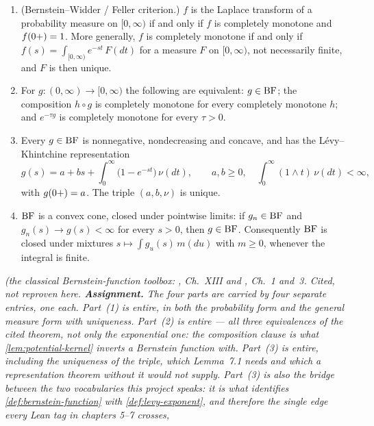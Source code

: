 \begin{proposition}\label{prop:bernstein-toolbox}
\begin{enumerate}
\item (Bernstein--Widder / Feller criterion.) $f$ is the Laplace transform of a probability
measure on $[0,\infty)$ if and only if $f$ is completely monotone and $f(0{+}) = 1$. More
generally, $f$ is completely monotone if and only if $f(s) = \int_{[0,\infty)} e^{-st}\,F(dt)$
for a measure $F$ on $[0,\infty)$, not necessarily finite, and $F$ is then unique.
\item For $g : (0,\infty) \to [0,\infty)$ the following are equivalent: $g \in \mathrm{BF}$; the
composition $h \circ g$ is completely monotone for every completely monotone $h$; and
$e^{-\tau g}$ is completely monotone for every $\tau > 0$.
\item Every $g \in \mathrm{BF}$ is nonnegative, nondecreasing and concave, and has the
Lévy--Khintchine representation
\[
  g(s) = a + b s + \int_0^\infty \bigl(1 - e^{-st}\bigr)\,\nu(dt), \qquad
  a, b \ge 0, \quad \int_0^\infty (1 \wedge t)\,\nu(dt) < \infty,
\]
with $g(0{+}) = a$. The triple $(a, b, \nu)$ is unique.
\item $\mathrm{BF}$ is a convex cone, closed under pointwise limits: if $g_n \in \mathrm{BF}$ and
$g_n(s) \to g(s) < \infty$ for every $s > 0$, then $g \in \mathrm{BF}$. Consequently $\mathrm{BF}$ is closed
under mixtures $s \mapsto \int g_u(s)\,m(du)$ with $m \ge 0$, whenever the integral is finite.
\end{enumerate}
\statusA\quad{}\quad{}\quad{}\quad{}\quad\emph{(the
classical Bernstein-function toolbox: , Ch.~XIII and
, Ch.~1 and~3. Cited, not reproven here.
\textbf{Assignment.} The four parts are carried by four separate entries, one each.
Part~(1) is  entire, in both the probability form and the general measure form
with uniqueness. Part~(2) is  entire --- all three equivalences of the cited
theorem, not only the exponential one: the composition clause is what
\ref{lem:potential-kernel} inverts a Bernstein function with. Part~(3) is  entire, including
the uniqueness of the triple, which Lemma~7.1 needs and which a representation theorem
without it would not supply. Part~(3) is also the \emph{bridge} between the two vocabularies
this project speaks: it is what identifies \ref{def:bernstein-function} with
\ref{def:levy-exponent}, and therefore the single edge every Lean tag in chapters 5--7 crosses,
}
\end{proposition}
